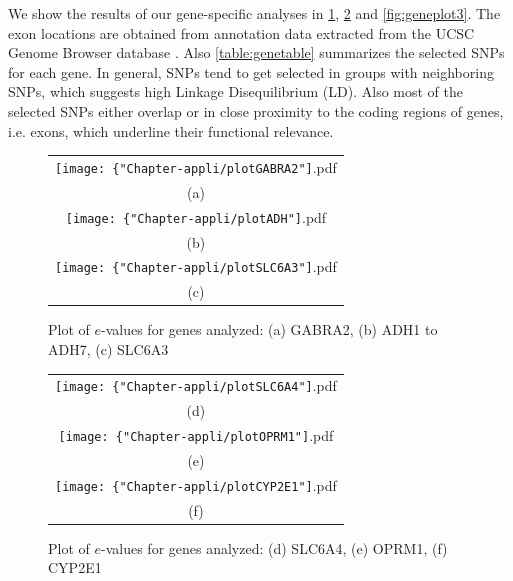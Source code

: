 We show the results of our gene-specific analyses in \ref{fig:geneplot1}, \ref{fig:geneplot2} and \ref{fig:geneplot3}. The exon locations are obtained from annotation data extracted from the UCSC Genome Browser database \citep{UCSCdata}. Also \ref{table:genetable} summarizes the selected SNPs for each gene. In general, SNPs tend to get selected in groups with neighboring SNPs, which suggests high Linkage Disequilibrium (LD). Also most of the selected SNPs either overlap or in close proximity to the coding regions of genes, i.e. exons, which underline their functional relevance.

\begin{figure}
\begin{center}

\begin{tabular}{c}
		\texttt{[image: \{"Chapter-appli/plotGABRA2"]}.pdf}\\
		(a)\\
		\texttt{[image: \{"Chapter-appli/plotADH"]}.pdf} \\
		(b)\\	
		\texttt{[image: \{"Chapter-appli/plotSLC6A3"]}.pdf}\\
		(c)\\	
\end{tabular}

\caption{Plot of $e$-values for genes analyzed: (a) GABRA2, (b) ADH1 to ADH7, (c) SLC6A3}
\label{fig:geneplot1}

\end{center}
\end{figure}

\begin{figure}
\begin{center}

\begin{tabular}{c}
		\texttt{[image: \{"Chapter-appli/plotSLC6A4"]}.pdf}\\
		(d)\\
		\texttt{[image: \{"Chapter-appli/plotOPRM1"]}.pdf} \\
		(e)\\	
		\texttt{[image: \{"Chapter-appli/plotCYP2E1"]}.pdf}\\
		(f)\\	
\end{tabular}

\caption{Plot of $e$-values for genes analyzed: (d) SLC6A4, (e) OPRM1, (f) CYP2E1}
\label{fig:geneplot2}

\end{center}
\end{figure}

